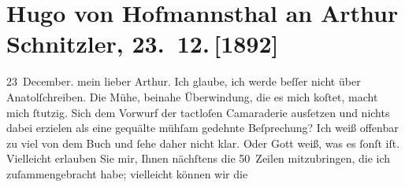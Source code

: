 

         
         \renewcommand{\erwaehntePersonen}{Personen: Bertha Flegmann, Hugo von Hofmannsthal, Paul Horn, Dorothea Kohnberger, Carl Schroeder}
         \renewcommand{\erwaehnteOrte}{Orte: Wien}
         \renewcommand{\erwaehnteWerke}{Werke: Anatol, Aspasia}
               \section[Hugo von Hofmannsthal an Arthur Schnitzler, 23. 12. {[}1892{]}]{ Hugo von Hofmannsthal an Arthur Schnitzler, 23. 12. {[}1892{]}}\nopagebreak{}\rehead{ }\begin{ledgroupsized}[t]{13cm}\normalsize\beginnumbering{} \toendnotes[C]{\smallbreak\pagebreak[2]} 
\toendnotes[C]{\smallbreak}\pstart
           \raggedleft{}{\pb}23 December.\pend
           \pstart{}mein lieber Arthur.\pend\pstart
           Ich glaube, ich werde beſſer nicht über Anatolſchreiben. Die Mühe, beinahe Überwindung, die es
               mich koſtet, macht mich ſtutzig. Sich dem Vorwurf der tactloſen Camaraderie ausſetzen
               und nichts dabei erzielen als eine gequälte mühſam gedehnte Beſprechung?\pend
           \pstart
           Ich weiß offenbar zu viel von dem Buch und ſehe daher nicht klar. Oder Gott weiß, was es ſonſt iſt. Vielleicht
               erlauben {\pb}Sie mir, Ihnen nächſtens
               die 50 Zeilen mitzubringen, die ich zuſammengebracht habe; vielleicht können wir die

\end{ledgroupsized}
